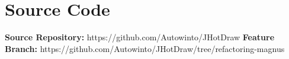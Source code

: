 
\section{Source Code}
\textbf{Source Repository:} https://github.com/Autowinto/JHotDraw
\textbf{Feature Branch:} https://github.com/Autowinto/JHotDraw/tree/refactoring-magnus